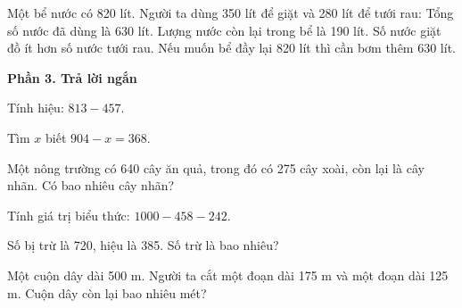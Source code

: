 \begin{ex} %
Một bể nước có 820 lít. Người ta dùng 350 lít để giặt và 280 lít để tưới rau:
\choiceTF
{\True Tổng số nước đã dùng là 630 lít.}
{\True Lượng nước còn lại trong bể là 190 lít.}
{Số nước giặt đồ ít hơn số nước tưới rau.}
{\True Nếu muốn bể đầy lại 820 lít thì cần bơm thêm 630 lít.}
\end{ex}

\textbf{Phần 3. Trả lời ngắn}

\begin{ex} %
Tính hiệu: $813 - 457$.
\end{ex}

\begin{ex} %
Tìm $x$ biết $904 - x = 368$.
\end{ex}

\begin{ex} %
Một nông trường có 640 cây ăn quả, trong đó có 275 cây xoài, còn lại là cây nhãn. Có bao nhiêu cây nhãn?
\end{ex}

\begin{ex} %
Tính giá trị biểu thức: $1 000 - 458 - 242$.
\end{ex}

\begin{ex} %
Số bị trừ là 720, hiệu là 385. Số trừ là bao nhiêu?
\end{ex}

\begin{ex} %
Một cuộn dây dài 500 m. Người ta cắt một đoạn dài 175 m và một đoạn dài 125 m. Cuộn dây còn lại bao nhiêu mét?
\end{ex}
